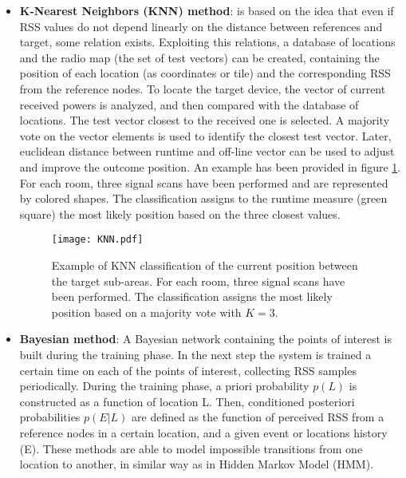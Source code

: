 \begin{itemize}
\item \textbf{K-Nearest Neighbors (KNN) method}: is based on the idea that even if RSS values do not depend linearly on the distance between references and target, some relation exists. Exploiting this relations, a database of locations and the radio map (the set of test vectors) can be created, containing the position of each location (as coordinates or tile) and the corresponding RSS from the reference nodes. To locate the target device, the vector of current received powers is analyzed, and then compared with the database of locations. The test vector closest to the received one is selected. A majority vote on the vector elements is used to identify the closest test vector. Later, euclidean distance between runtime and off-line vector can be used to adjust and improve the outcome position.
An example has been provided in figure \ref{fig:KNN}. For each room, three signal scans have been performed and are represented by colored shapes. The classification assigns to the runtime measure (green square) the most likely position based on the three closest values.

\begin{figure}[h!tb]
\centering\texttt{[image: KNN.pdf]}
\caption[Example of KNN classification of a position between the target sub-areas]{Example of KNN classification of the current position between the target sub-areas. For each room, three signal scans have been performed. The classification assigns the most likely position based on a majority vote with $K=3$.}
\label{fig:KNN}
\end{figure}

\item \textbf{Bayesian method}: A Bayesian network containing the points of interest is built during the training phase. In the next step the system is trained a certain time on each of the points of interest, collecting RSS samples periodically. During the training phase, a priori probability $p(L)$ is constructed as a function of location L. Then, conditioned posteriori probabilities $p(E|L)$ are defined as the function of perceived RSS from a reference nodes in a certain location, and a given event or locations history (E). These methods are able to model impossible transitions from one location to another, in similar way as in Hidden Markov Model (HMM).


\end{itemize}
